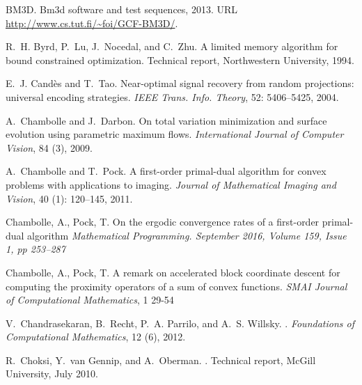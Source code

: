 \documentclass[twoside,11pt]{article}
\numberwithin{equation}{section}
\numberwithin{theorem}{section}
\begin{document}
\begin{thebibliography}{86}
BM3D.
\newblock Bm3d software and test sequences, 2013.
\newblock URL \url{http://www.cs.tut.fi/~foi/GCF-BM3D/}.

R.~H. Byrd, P.~Lu, J.~Nocedal, and C.~Zhu.
\newblock A limited memory algorithm for bound constrained optimization.
\newblock Technical report, Northwestern University, 1994.

E.~J. Candès and T.~Tao.
\newblock Near-optimal signal recovery from random projections: universal
  encoding strategies.
\newblock \emph{IEEE Trans. Info. Theory}, 52: 5406--5425, 2004.

A.~Chambolle and J.~Darbon.
\newblock On total variation minimization and surface evolution using
  parametric maximum flows.
\newblock \emph{International Journal of Computer Vision}, 84 (3),
  2009.

A.~Chambolle and T.~Pock.
\newblock A first-order primal-dual algorithm for convex problems with
  applications to imaging.
\newblock \emph{Journal of Mathematical Imaging and Vision}, 40
  (1): 120--145, 2011.

Chambolle, A., Pock, T.
\newblock On the ergodic convergence rates of a first-order primal-dual algorithm
\newblock \emph{Mathematical Programming. September 2016, Volume 159, Issue 1, pp 253–287}

Chambolle, A., Pock, T.
\newblock A remark on accelerated block coordinate descent for computing the proximity operators of a sum of convex functions.
\newblock \emph{SMAI Journal of Computational Mathematics}, 1 29-54

V.~Chandrasekaran, B.~Recht, P.~A. Parrilo, and A.~S. Willsky.
.
\newblock \emph{Foundations of Computational Mathematics}, 12 (6),
  2012.

R.~Choksi, Y.~van Gennip, and A.~Oberman.
.
\newblock Technical report, McGill University, July 2010.


\end{thebibliography}
\end{document}
